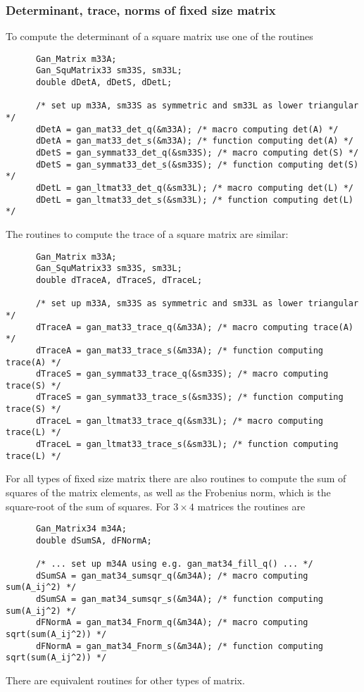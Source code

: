 \subsubsection{Determinant, trace, norms of fixed size matrix}
\label{fixed-det-trace-norms-sec}
To compute the determinant of a square matrix use one of the routines
\begin{verbatim}
      Gan_Matrix m33A;
      Gan_SquMatrix33 sm33S, sm33L;
      double dDetA, dDetS, dDetL;

      /* set up m33A, sm33S as symmetric and sm33L as lower triangular */
      dDetA = gan_mat33_det_q(&m33A); /* macro computing det(A) */
      dDetA = gan_mat33_det_s(&m33A); /* function computing det(A) */
      dDetS = gan_symmat33_det_q(&sm33S); /* macro computing det(S) */
      dDetS = gan_symmat33_det_s(&sm33S); /* function computing det(S) */
      dDetL = gan_ltmat33_det_q(&sm33L); /* macro computing det(L) */
      dDetL = gan_ltmat33_det_s(&sm33L); /* function computing det(L) */
\end{verbatim}
The routines to compute the trace of a square matrix are similar:
\begin{verbatim}
      Gan_Matrix m33A;
      Gan_SquMatrix33 sm33S, sm33L;
      double dTraceA, dTraceS, dTraceL;

      /* set up m33A, sm33S as symmetric and sm33L as lower triangular */
      dTraceA = gan_mat33_trace_q(&m33A); /* macro computing trace(A) */
      dTraceA = gan_mat33_trace_s(&m33A); /* function computing trace(A) */
      dTraceS = gan_symmat33_trace_q(&sm33S); /* macro computing trace(S) */
      dTraceS = gan_symmat33_trace_s(&sm33S); /* function computing trace(S) */
      dTraceL = gan_ltmat33_trace_q(&sm33L); /* macro computing trace(L) */
      dTraceL = gan_ltmat33_trace_s(&sm33L); /* function computing trace(L) */
\end{verbatim}
For all types of fixed size matrix there are also routines to compute the
sum of squares of the matrix elements, as well as the Frobenius norm,
which is the square-root of the sum of squares. For $3\times 4$ matrices
the routines are
\begin{verbatim}
      Gan_Matrix34 m34A;
      double dSumSA, dFNormA;

      /* ... set up m34A using e.g. gan_mat34_fill_q() ... */
      dSumSA = gan_mat34_sumsqr_q(&m34A); /* macro computing sum(A_ij^2) */
      dSumSA = gan_mat34_sumsqr_s(&m34A); /* function computing sum(A_ij^2) */
      dFNormA = gan_mat34_Fnorm_q(&m34A); /* macro computing sqrt(sum(A_ij^2)) */
      dFNormA = gan_mat34_Fnorm_s(&m34A); /* function computing sqrt(sum(A_ij^2)) */
\end{verbatim}
There are equivalent routines for other types of matrix.

